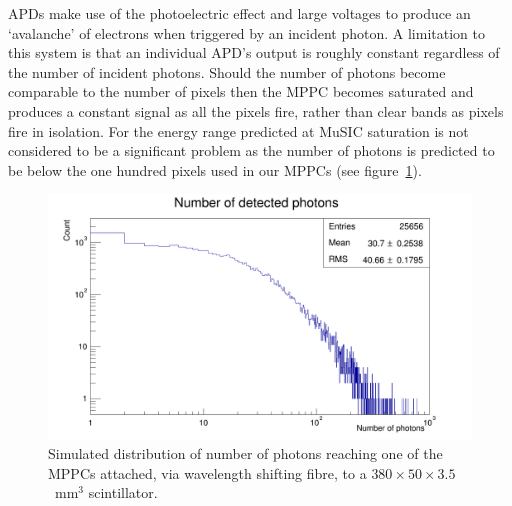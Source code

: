 APDs make use of the photoelectric effect and large voltages to produce an `avalanche' of electrons when triggered by an incident photon. A limitation to this system is that an individual APD's output is roughly constant regardless of the number of incident photons. Should the number of photons become comparable to the number of pixels then the MPPC becomes saturated and produces a constant signal as all the pixels fire, rather than clear bands as pixels fire in isolation. For the energy range predicted at MuSIC saturation is not considered to be a significant problem as the number of photons is predicted to be below the one hundred pixels used in our MPPCs (see figure~\ref{fig:sim_n_photons}). 

\begin{figure}[hptb] 
  \centering    \includegraphics[width=.9\textwidth]{images/plot_generating_scripts/n_photons.png}
  \caption{Simulated distribution of number of photons reaching one of the MPPCs attached, via wavelength shifting fibre, to a \(380\times50\times3.5\)~mm\(^3\) scintillator.}
  \label{fig:sim_n_photons}
\end{figure}


